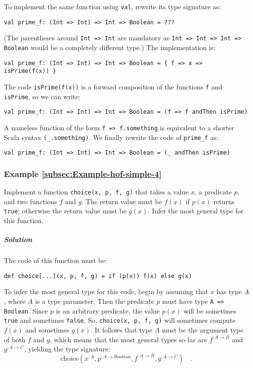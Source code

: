 To implement the same function using \lstinline!val!, rewrite its
type signature as:
\begin{lstlisting}
val prime_f: (Int => Int) => Int => Boolean = ???
\end{lstlisting}
(The parentheses around \lstinline!Int => Int! are mandatory as \lstinline!Int => Int => Int => Boolean!
would be a completely different type.) The implementation is:
\begin{lstlisting}
val prime_f: (Int => Int) => Int => Boolean = { f => x => isPrime(f(x)) }
\end{lstlisting}
The code \lstinline!isPrime(f(x))! is a forward composition of the
functions \lstinline!f! and \lstinline!isPrime!, so we can write:
\begin{lstlisting}
val prime_f: (Int => Int) => Int => Boolean = (f => f andThen isPrime)
\end{lstlisting}
A nameless function of the form \lstinline!f => f.something! is equivalent
to a shorter Scala syntax \lstinline!(_.something)!. We finally rewrite
the code of \lstinline!prime_f! as:
\begin{lstlisting}
val prime_f: (Int => Int) => Int => Boolean = (_ andThen isPrime)
\end{lstlisting}


\subsubsection{Example \label{subsec:Example-hof-simple-4}\ref{subsec:Example-hof-simple-4}}

Implement a function \lstinline!choice(x, p, f, g)! that takes a
value $x$, a predicate $p$, and two functions $f$ and $g$. The
return value must be $f(x)$ if $p(x)$ returns \lstinline!true!;
otherwise the return value must be $g(x)$. Infer the most general
type for this function.

\subparagraph{Solution}

The code of this function must be:
\begin{lstlisting}
def choice[...](x, p, f, g) = if (p(x)) f(x) else g(x)
\end{lstlisting}
To infer the most general type for this code, begin by assuming that
$x$ has type $A$, where $A$ is a type parameter. Then the predicate
$p$ must have type \lstinline!A => Boolean!. Since $p$ is an arbitrary
predicate, the value $p(x)$ will be sometimes \lstinline!true! and
sometimes \lstinline!false!. So, \lstinline!choice(x, p, f, g)!
will sometimes compute $f(x)$ and sometimes $g(x)$. It follows that
type $A$ must be the argument type of both $f$ and $g$, which means
that the most general types so far are $f^{:A\rightarrow B}$ and
$g^{:A\rightarrow C}$, yielding the type signature:
\[
\text{choice}(x^{:A},p^{:A\rightarrow\text{Boolean}},f^{:A\rightarrow B},g^{:A\rightarrow C})\quad.
\]

